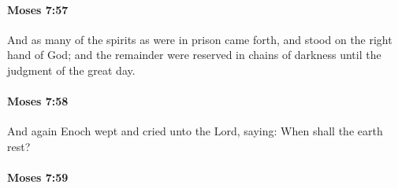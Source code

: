 
		\paragraph{Moses 7:57} %
			\label{MOSES-7-57}

			And as many of the spirits as were in prison came forth, and stood on the right hand of God; and the remainder were reserved in chains of darkness until the judgment of the great day.


		\paragraph{Moses 7:58} %
			\label{MOSES-7-58}

			And again Enoch wept and cried unto the Lord, saying: When shall the earth rest?


		\paragraph{Moses 7:59} %
			\label{MOSES-7-59}

